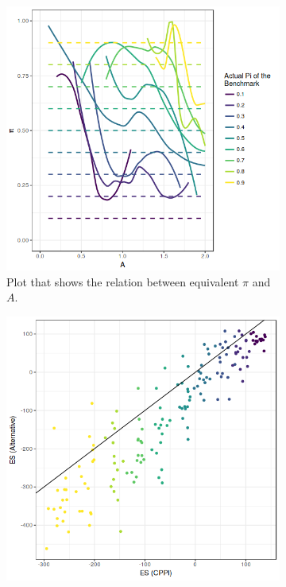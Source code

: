 
\begin{figure}
\centering
\begin{subfigure}{.5\textwidth}
    \centering
    \includegraphics[scale=0.5]{./images/pi-a_mort2.png}
    \caption{Plot that shows the relation between equivalent $\pi$ and $A$.}
    \label{fig:pi-a_mort}
\end{subfigure}%
\begin{subfigure}{.5\textwidth}
    \centering
    \includegraphics[scale=0.5]{./images/es-es_mort_2.png}

\end{subfigure}
\end{figure}

